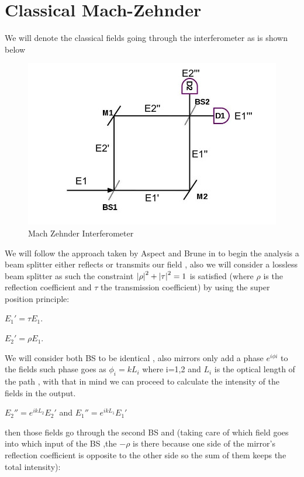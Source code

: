 \documentclass[11pt]{article}
\begin{document}
\section{Classical Mach-Zehnder}

We will denote the classical fields going through the interferometer as is shown below


\begin{figure}[h!]
\centering
\includegraphics[width=\linewidth]{machzenhdercla.jpg}
\caption{Mach Zehnder Interferometer}
\label{fig:BS2}
\end{figure}

We will follow the approach taken by Aspect and Brune in \cite{coursera} to begin the analysis a beam splitter either reflects or transmits our field , also we will consider a lossless beam splitter as such the constraint $\abs{\rho}^2 +\abs{\tau}^2=1 $ is satisfied (where $\rho$ is the reflection coefficient and $\tau$ the transmission coefficient) by using the super position principle:

$E_{1}'=\tau E_{1}$.

$E_{2}'=\rho E_{1}$.


We will consider both BS to be identical , also mirrors only add a phase $e^{i\phi{i}}$ to the fields such phase goes as $\phi_{i}=kL_{i}$ where i=1,2 and $L_{i}$ is the optical length of the path , with that in mind we can proceed to calculate the intensity of the fields in the output.


$E_{2}''=e^{ikL_{2}}E_{2}'$  and   $E_{1}''=e^{ikL_{1}}E_{1}'$ 

then those fields go through the second BS and (taking care of which field goes into which input of the BS ,the $-\rho$ is there because one side of the mirror's reflection coefficient is opposite to the other side  so the sum of them keeps the total intensity):
\end{document}

